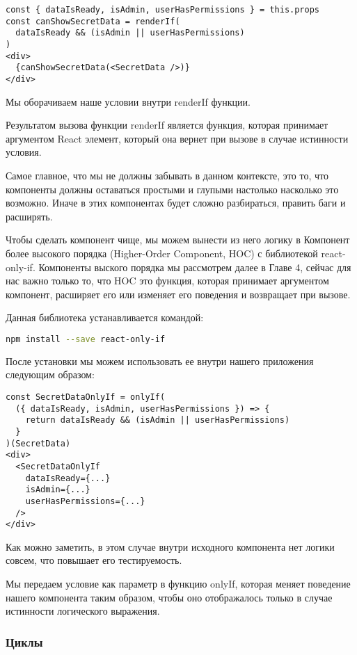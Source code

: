 \begin{lstlisting}
const { dataIsReady, isAdmin, userHasPermissions } = this.props
const canShowSecretData = renderIf(
  dataIsReady && (isAdmin || userHasPermissions)
)
<div>
  {canShowSecretData(<SecretData />)}
</div>
\end{lstlisting}


Мы оборачиваем наше условии внутри renderIf функции.

Результатом вызова функции renderIf является функция, которая принимает аргументом React элемент, который она вернет при вызове в случае истинности условия.

Самое главное, что мы не должны забывать в данном контексте, это то, что компоненты должны оставаться простыми и глупыми настолько насколько это возможно. Иначе в этих компонентах будет сложно разбираться, править баги и расширять.

Чтобы сделать компонент чище, мы можем вынести из него логику в Компонент более высокого порядка (Higher-Order Component, HOC) с библиотекой react-only-if. Компоненты выского порядка мы рассмотрем далее в Главе 4, сейчас для нас важно только то, что HOC это функция, которая принимает аргументом компонент, расширяет его или изменяет его поведения и возвращает при вызове.

Данная библиотека устанавливается командой:

\begin{lstlisting}[language=bash]
npm install --save react-only-if
\end{lstlisting}

После установки мы можем использовать ее внутри нашего приложения следующим образом:

\begin{lstlisting}
const SecretDataOnlyIf = onlyIf(
  ({ dataIsReady, isAdmin, userHasPermissions }) => {
    return dataIsReady && (isAdmin || userHasPermissions)
  }
)(SecretData)
<div>
  <SecretDataOnlyIf
    dataIsReady={...}
    isAdmin={...}
    userHasPermissions={...}
  /> 
</div>
\end{lstlisting}

Как можно заметить, в этом случае внутри исходного компонента нет логики совсем, что повышает его тестируемость.

Мы передаем условие как параметр в функцию onlyIf, которая меняет поведение нашего компонента таким образом, чтобы оно отображалось только в случае истинности логического выражения.

\subsubsection*{Циклы}

